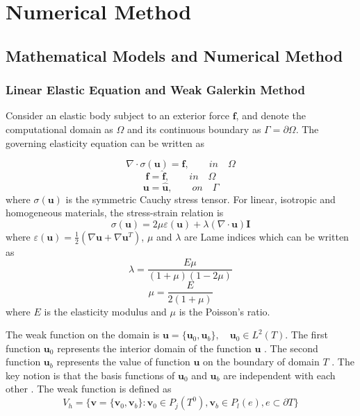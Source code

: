 \chapter{Numerical Method}
\label{chapter2}

\section{Mathematical Models and Numerical Method}
\label{sec:equations}

\subsection{Linear Elastic Equation and Weak Galerkin Method}
Consider an elastic body subject to an exterior force $ \mathbf{f} $, and denote the computational domain as $ \Omega $ and its continuous boundary as $ \Gamma = \partial \Omega $. The governing elasticity equation can be written as

\begin{equation}
\nabla \cdot \sigma(\mathbf{u}) = \mathbf{f}, \qquad in \quad \Omega 
\end{equation}
\begin{equation}
\mathbf{f} = \hat{\mathbf{f}}, \qquad in \quad \Omega
\end{equation}
\begin{equation}
\mathbf{u} = \hat{\mathbf{u}}, \qquad on \quad \Gamma
\end{equation}
where $ \sigma(\mathbf{u}) $ is the symmetric Cauchy stress tensor. For linear, isotropic and homogeneous materials, the stress-strain relation is
\begin{equation}
\sigma(\mathbf{u}) = 2 \mu \varepsilon(\mathbf{u}) + \lambda (\nabla \cdot \mathbf{u}) \mathbf{I}
\end{equation}
where $ \varepsilon(\mathbf{u}) = \frac{1}{2} (\nabla \mathbf{u} + \nabla \mathbf{u}^{T}) $, $ \mu $ and $ \lambda  $ are Lame indices which can be written as 
\begin{equation}
\lambda = \frac{E\mu }{(1 + \mu) (1 - 2\mu)}
\end{equation}
\begin{equation}
\mu = \frac{E}{2(1+\mu)}
\end{equation}
where $ E $ is the elasticity modulus and $ \mu $ is the Poisson's ratio.



The weak function on the domain is $ \mathbf{u} = \{\mathbf{u}_0, \mathbf{u}_b \}, \quad \mathbf{u}_0 \in L^{2} (T) $. The first function $ \mathbf{u}_0 $  represents the interior domain of the function $ \mathbf{u} $ . The second function $ \mathbf{u}_b $ represents the value of function $ \mathbf{u} $ on the boundary of domain $ T $ . The key notion is that the basis functions of $ \mathbf{u}_0 $  and $ \mathbf{u}_b $  are independent with each other . The weak function is defined as
\begin{equation}
V_{h} = \{ \mathbf{v} = \{ \mathbf{v}_0, \mathbf{v}_b \} : \mathbf{v}_0 \in P_{j} (T^0), \mathbf{v}_b \in P_{l}(e), e \subset \partial T\}
\end{equation}

